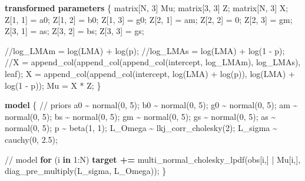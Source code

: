 \documentclass[
  12pt,
  letterpaper,
  DIV=11,
  numbers=noendperiod]{scrartcl}
\newenvironment{Shaded}{\begin{snugshade}}{\end{snugshade}}
\newcommand{\CommentTok}[1]{\textcolor[rgb]{0.37,0.37,0.37}{#1}}
\newcommand{\ControlFlowTok}[1]{\textcolor[rgb]{0.00,0.23,0.31}{\textbf{#1}}}
\newcommand{\DataTypeTok}[1]{\textcolor[rgb]{0.68,0.00,0.00}{#1}}
\newcommand{\DecValTok}[1]{\textcolor[rgb]{0.68,0.00,0.00}{#1}}
\newcommand{\FloatTok}[1]{\textcolor[rgb]{0.68,0.00,0.00}{#1}}
\newcommand{\KeywordTok}[1]{\textcolor[rgb]{0.00,0.23,0.31}{\textbf{#1}}}
\newcommand{\NormalTok}[1]{\textcolor[rgb]{0.00,0.23,0.31}{#1}}
\numberwithin{equation}{section} %
\begin{document}
\begin{Shaded}
\begin{Highlighting}[]
\KeywordTok{transformed parameters}\NormalTok{ \{}
  \DataTypeTok{matrix}\NormalTok{[N, }\DecValTok{3}\NormalTok{] Mu;}
  \DataTypeTok{matrix}\NormalTok{[}\DecValTok{3}\NormalTok{, }\DecValTok{3}\NormalTok{] Z;}
  \DataTypeTok{matrix}\NormalTok{[N, }\DecValTok{3}\NormalTok{] X;}
\NormalTok{  Z[}\DecValTok{1}\NormalTok{, }\DecValTok{1}\NormalTok{] = a0;}
\NormalTok{  Z[}\DecValTok{1}\NormalTok{, }\DecValTok{2}\NormalTok{] = b0;}
\NormalTok{  Z[}\DecValTok{1}\NormalTok{, }\DecValTok{3}\NormalTok{] = g0;}
\NormalTok{  Z[}\DecValTok{2}\NormalTok{, }\DecValTok{1}\NormalTok{] = am;}
\NormalTok{  Z[}\DecValTok{2}\NormalTok{, }\DecValTok{2}\NormalTok{] = }\DecValTok{0}\NormalTok{;}
\NormalTok{  Z[}\DecValTok{2}\NormalTok{, }\DecValTok{3}\NormalTok{] = gm;}
\NormalTok{  Z[}\DecValTok{3}\NormalTok{, }\DecValTok{1}\NormalTok{] = as;}
\NormalTok{  Z[}\DecValTok{3}\NormalTok{, }\DecValTok{2}\NormalTok{] = bs;}
\NormalTok{  Z[}\DecValTok{3}\NormalTok{, }\DecValTok{3}\NormalTok{] = gs;}

  \CommentTok{//log\_LMAm = log(LMA) + log(p);}
  \CommentTok{//log\_LMAs = log(LMA) + log(1 {-} p);}
  \CommentTok{//X = append\_col(append\_col(append\_col(intercept, log\_LMAm), log\_LMAs), leaf);}
\NormalTok{  X = append\_col(append\_col(intercept, log(LMA) + log(p)), log(LMA) + log(}\DecValTok{1}\NormalTok{ {-} p));}
\NormalTok{  Mu = X * Z;}
\NormalTok{\}}

\KeywordTok{model}\NormalTok{ \{}
  \CommentTok{// priors}
\NormalTok{  a0 \textasciitilde{} normal(}\DecValTok{0}\NormalTok{, }\DecValTok{5}\NormalTok{);}
\NormalTok{  b0 \textasciitilde{} normal(}\DecValTok{0}\NormalTok{, }\DecValTok{5}\NormalTok{);}
\NormalTok{  g0 \textasciitilde{} normal(}\DecValTok{0}\NormalTok{, }\DecValTok{5}\NormalTok{);}
\NormalTok{  am \textasciitilde{} normal(}\DecValTok{0}\NormalTok{, }\DecValTok{5}\NormalTok{);}
\NormalTok{  bs \textasciitilde{} normal(}\DecValTok{0}\NormalTok{, }\DecValTok{5}\NormalTok{);}
\NormalTok{  gm \textasciitilde{} normal(}\DecValTok{0}\NormalTok{, }\DecValTok{5}\NormalTok{);}
\NormalTok{  gs \textasciitilde{} normal(}\DecValTok{0}\NormalTok{, }\DecValTok{5}\NormalTok{);}
\NormalTok{  as \textasciitilde{} normal(}\DecValTok{0}\NormalTok{, }\DecValTok{5}\NormalTok{);}
\NormalTok{  p \textasciitilde{} beta(}\DecValTok{1}\NormalTok{, }\DecValTok{1}\NormalTok{);}
\NormalTok{  L\_Omega \textasciitilde{} lkj\_corr\_cholesky(}\DecValTok{2}\NormalTok{);}
\NormalTok{  L\_sigma \textasciitilde{} cauchy(}\DecValTok{0}\NormalTok{, }\FloatTok{2.5}\NormalTok{);}

  \CommentTok{// model}
  \ControlFlowTok{for}\NormalTok{ (i }\ControlFlowTok{in} \DecValTok{1}\NormalTok{:N)}
     \KeywordTok{target +=}\NormalTok{ multi\_normal\_cholesky\_lpdf(obs[i,] | Mu[i,], diag\_pre\_multiply(L\_sigma, L\_Omega));}
\NormalTok{\}}


\end{Highlighting}
\end{Shaded}
\end{document}
